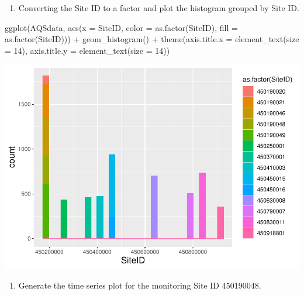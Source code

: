 \documentclass[
]{article}
\newenvironment{Shaded}{\begin{snugshade}}{\end{snugshade}}
\newcommand{\AttributeTok}[1]{\textcolor[rgb]{0.77,0.63,0.00}{#1}}
\newcommand{\DecValTok}[1]{\textcolor[rgb]{0.00,0.00,0.81}{#1}}
\newcommand{\FunctionTok}[1]{\textcolor[rgb]{0.00,0.00,0.00}{#1}}
\newcommand{\NormalTok}[1]{#1}
\newcommand{\SpecialCharTok}[1]{\textcolor[rgb]{0.00,0.00,0.00}{#1}}
\providecommand{\tightlist}{%
  \setlength{\itemsep}{0pt}\setlength{\parskip}{0pt}}
\begin{document}
\begin{enumerate}
\def\labelenumi{\alph{enumi}.}
\setcounter{enumi}{5}
\tightlist
\item
  Converting the Site ID to a factor and plot the histogram grouped by
  Site ID.
\end{enumerate}

\begin{Shaded}
\begin{Highlighting}[]
\FunctionTok{ggplot}\NormalTok{(AQSdata, }\FunctionTok{aes}\NormalTok{(}\AttributeTok{x =}\NormalTok{ SiteID, }\AttributeTok{color =} \FunctionTok{as.factor}\NormalTok{(SiteID), }\AttributeTok{fill =} \FunctionTok{as.factor}\NormalTok{(SiteID))) }\SpecialCharTok{+}
    \FunctionTok{geom\_histogram}\NormalTok{() }\SpecialCharTok{+} \FunctionTok{theme}\NormalTok{(}\AttributeTok{axis.title.x =} \FunctionTok{element\_text}\NormalTok{(}\AttributeTok{size =} \DecValTok{14}\NormalTok{),}
    \AttributeTok{axis.title.y =} \FunctionTok{element\_text}\NormalTok{(}\AttributeTok{size =} \DecValTok{14}\NormalTok{))}
\end{Highlighting}
\end{Shaded}

\includegraphics{HW1-Trinath-Sai-Subhash-Reddy-Pittala_files/figure-latex/unnamed-chunk-23-1.pdf}

\begin{enumerate}
\def\labelenumi{\alph{enumi}.}
\setcounter{enumi}{6}
\tightlist
\item
  Generate the time series plot for the monitoring Site ID 450190048.
\end{enumerate}
\end{document}
